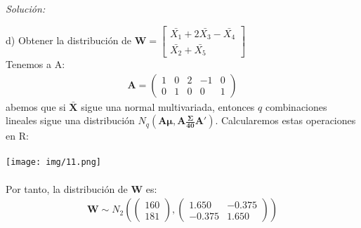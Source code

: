 \documentclass[12pt]{article}
\newenvironment{sol}
    {\emph{Solución:}
    }
    {
    }
\begin{document}
\begin{sol}
d) Obtener la distribución de $\mathbf{W}= \begin{bmatrix}
\bar{X_1} + 2\bar{X_3}-\bar{X_4} \\
\bar{X_2}+\bar{X_5}
\end{bmatrix}$\\
Tenemos a A:
\begin{align*}\mathbf{A}=
\begin{pmatrix}
1 & 0 & 2 & -1 & 0\\
0 & 1 & 0 & 0 & 1
\end{pmatrix}
\end{align*}
abemos que si $\mathbf{\bar{X}}$ sigue una normal multivariada, entonces  $q$ combinaciones lineales sigue una distribución $N_q(\mathbf{A \mu , A \frac{\Sigma}{40} A'})$. Calcularemos estas operaciones en R:\\\\
\texttt{[image: img/11.png]}\\\\
Por tanto, la distribución de $\mathbf{W}$ es:
\begin{align*}
\mathbf{W}\sim N_2(\begin{pmatrix}
160\\181
\end{pmatrix}, 
\begin{pmatrix}
1.650 & -0.375 \\
-0.375 & 1.650
\end{pmatrix})
\end{align*}
\end{sol}

\pagebreak




\end{document}
